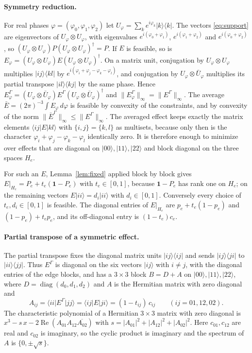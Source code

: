 \documentclass[11pt,a4paper]{article}
\theoremstyle{definition}
\theoremstyle{plain}
\newcommand{\ket}[1]{\lvert#1\rangle}
\newcommand{\bra}[1]{\langle#1\rvert}
\newcommand{\norm}[1]{\lVert#1\rVert}
\newcommand{\one}{\mathbf{1}}
\begin{document}
\paragraph{Symmetry reduction.}
For real phases $\varphi=(\varphi_0,\varphi_1,\varphi_2)$ let
$U_\varphi=\sum_k e^{i\varphi_k}\ket k\bra k$. The vectors \eqref{eq:support}
are eigenvectors of $U_\varphi\otimes U_\varphi$, with eigenvalues
$e^{i(\varphi_0+\varphi_1)}$, $e^{i(\varphi_1+\varphi_2)}$ and
$e^{i(\varphi_0+\varphi_2)}$, so $(U_\varphi\otimes U_\varphi)P(U_\varphi\otimes
U_\varphi)^\dagger=P$. If $E$ is feasible, so is
$E_\varphi=(U_\varphi\otimes U_\varphi)E(U_\varphi\otimes U_\varphi)^\dagger$.
On a matrix unit, conjugation by $U_\varphi\otimes U_\varphi$ multiplies
$\ket{ij}\bra{kl}$ by $e^{i(\varphi_i+\varphi_j-\varphi_k-\varphi_l)}$, and
conjugation by $U_\varphi\otimes\bar U_\varphi$ multiplies its partial
transpose $\ket{il}\bra{kj}$ by the same phase. Hence
$E_\varphi^\Gamma=(U_\varphi\otimes\bar U_\varphi)E^\Gamma(U_\varphi\otimes\bar
U_\varphi)^\dagger$ and $\norm{E_\varphi^\Gamma}_\infty=\norm{E^\Gamma}_\infty$.
The average $\bar E=(2\pi)^{-3}\int E_\varphi\,d\varphi$ is feasible by
convexity of the constraints, and by convexity of the norm
$\norm{\bar E^\Gamma}_\infty\le\norm{E^\Gamma}_\infty$. The averaged effect
keeps exactly the matrix elements $\bra{ij}E\ket{kl}$ with
$\{i,j\}=\{k,l\}$ as multisets, because only then is the character
$\varphi_i+\varphi_j-\varphi_k-\varphi_l$ identically zero. It is therefore
enough to minimize over effects that are diagonal on $\ket{00},\ket{11},\ket{22}$
and block diagonal on the three spaces $H_e$.

For such an $E$, Lemma~\ref{lem:fixed} applied block by block gives
$E|_{H_e}=P_e+t_e(\one-P_e)$ with $t_e\in[0,1]$, because $\one-P_e$ has rank
one on $H_e$; on the remaining vectors $E\ket{ii}=d_i\ket{ii}$ with
$d_i\in[0,1]$. Conversely every choice of $t_e,d_i\in[0,1]$ is feasible. The
diagonal entries of $E|_{H_e}$ are $p_e+t_e(1-p_e)$ and
$(1-p_e)+t_ep_e$, and its off-diagonal entry is $(1-t_e)c_e$.

\paragraph{Partial transpose of a symmetric effect.}
The partial transpose fixes the diagonal matrix units $\ket{ij}\bra{ij}$ and
sends $\ket{ij}\bra{ji}$ to $\ket{ii}\bra{jj}$. Thus $E^\Gamma$ is diagonal on
the six vectors $\ket{ij}$ with $i\ne j$, with the diagonal entries of the edge
blocks, and has a $3\times3$ block $B=D+A$ on $\ket{00},\ket{11},\ket{22}$,
where $D=\operatorname{diag}(d_0,d_1,d_2)$ and $A$ is the Hermitian matrix with
zero diagonal and
\[
A_{ij}=\bra{ii}E^\Gamma\ket{jj}=\bra{ij}E\ket{ji}=(1-t_{ij})\,c_{ij}
\qquad(ij=01,12,02).
\]
The characteristic polynomial of a Hermitian $3\times3$ matrix with zero
diagonal is $x^3-s\,x-2\operatorname{Re}(A_{01}A_{12}\overline{A_{02}})$ with
$s=|A_{01}|^2+|A_{12}|^2+|A_{02}|^2$. Here $c_{01},c_{12}$ are real and
$c_{02}$ is imaginary, so the cyclic product is imaginary and the spectrum of
$A$ is $\{0,\pm\sqrt s\}$.
\end{document}
